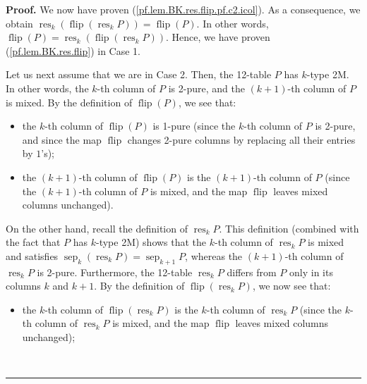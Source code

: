 \documentclass[numbers=enddot,12pt,final,onecolumn,notitlepage]{scrartcl}%
\theoremstyle{definition}
\newenvironment{proof}[1][Proof]{\noindent\textbf{#1.} }{\ \rule{0.5em}{0.5em}}
\newenvironment{verlong}{}{}
\begin{document}
\begin{verlong}
\begin{proof}
We now have proven (\ref{pf.lem.BK.res.flip.pf.c2.icol}). As a consequence, we
obtain $\operatorname*{res}\nolimits_{k}\left(  \operatorname*{flip}\left(
\operatorname*{res}\nolimits_{k}P\right)  \right)  =\operatorname*{flip}%
\left(  P\right)  $. In other words, $\operatorname*{flip}\left(  P\right)
=\operatorname*{res}\nolimits_{k}\left(  \operatorname*{flip}\left(
\operatorname*{res}\nolimits_{k}P\right)  \right)  $. Hence, we have proven
(\ref{pf.lem.BK.res.flip}) in Case 1.

Let us next assume that we are in Case 2. Then, the 12-table $P$ has $k$-type
2M. In other words, the $k$-th column of $P$ is 2-pure, and the $\left(
k+1\right)  $-th column of $P$ is mixed. By the definition of
$\operatorname*{flip}\left(  P\right)  $, we see that:

\begin{itemize}
\item the $k$-th column of $\operatorname*{flip}\left(  P\right)  $ is 1-pure
(since the $k$-th column of $P$ is 2-pure, and since the map
$\operatorname*{flip}$ changes 2-pure columns by replacing all their entries
by $1$'s);

\item the $\left(  k+1\right)  $-th column of $\operatorname*{flip}\left(
P\right)  $ is the $\left(  k+1\right)  $-th column of $P$ (since the $\left(
k+1\right)  $-th column of $P$ is mixed, and the map $\operatorname*{flip}$
leaves mixed columns unchanged).
\end{itemize}

On the other hand, recall the definition of $\operatorname*{res}%
\nolimits_{k}P$. This definition (combined with the fact that $P$ has $k$-type
2M) shows that the $k$-th column of $\operatorname*{res}_{k}P$ is mixed and
satisfies $\operatorname*{sep}\nolimits_{k}\left(  \operatorname*{res}%
\nolimits_{k}P\right)  =\operatorname*{sep}\nolimits_{k+1}P$, whereas the
$\left(  k+1\right)  $-th column of $\operatorname*{res}\nolimits_{k}P$ is
2-pure. Furthermore, the 12-table $\operatorname*{res}\nolimits_{k}P$ differs
from $P$ only in its columns $k$ and $k+1$. By the definition of
$\operatorname*{flip}\left(  \operatorname*{res}\nolimits_{k}P\right)  $, we
now see that:

\begin{itemize}
\item the $k$-th column of $\operatorname*{flip}\left(  \operatorname*{res}%
\nolimits_{k}P\right)  $ is the $k$-th column of $\operatorname*{res}%
\nolimits_{k}P$ (since the $k$-th column of $\operatorname*{res}%
\nolimits_{k}P$ is mixed, and the map $\operatorname*{flip}$ leaves mixed
columns unchanged);


\end{itemize}
\end{proof}
\end{verlong}
\end{document}
